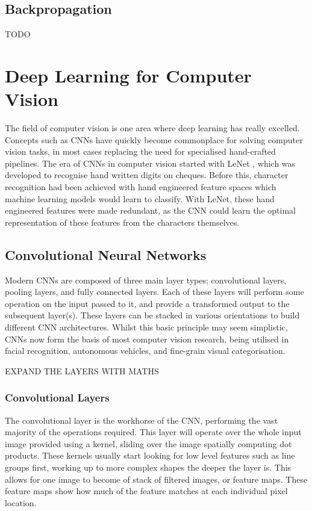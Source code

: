\subsection{Backpropagation}\label{ch:Background,sec:DLIntro,sub:backprop}
TODO


\section{Deep Learning for Computer Vision}\label{ch:Background,sec:DLforCV}

The field of computer vision is one area where deep learning has really excelled. Concepts such as CNNs have quickly become commonplace for solving computer vision tasks, in most cases replacing the need for specialised hand-crafted pipelines. The era of CNNs in computer vision started with LeNet \cite{lecun_gradient-based_1998}, which was developed to recognise hand written digits on cheques. Before this, character recognition had been achieved with hand engineered feature spaces which machine learning models would learn to classify. With LeNet, these hand engineered features were made redundant, as the CNN could learn the optimal representation of these features from the characters themselves. 

\subsection{Convolutional Neural Networks}\label{ch:Background,sec:CNN,sub:CNN}
Modern CNNs are composed of three main layer types; convolutional layers, pooling layers, and fully connected layers. Each of these layers will perform some operation on the input passed to it, and provide a transformed output to the subsequent layer(s). These layers can be stacked in various orientations to build different CNN architectures. Whilst this basic principle may seem simplistic, CNNs now form the basis of most computer vision research, being utilised in facial recognition, autonomous vehicles, and fine-grain visual categorisation. 

EXPAND THE LAYERS WITH MATHS
\subsubsection{Convolutional Layers}\label{ch:Background,sec:CNN,sub:CNN,subsub:convolution}
The convolutional layer is the workhorse of the CNN, performing the vast majority of the operations required. This layer will operate over the whole input image provided using a kernel, sliding over the image spatially computing dot products. These kernels usually start looking for low level features such as line groups first, working up to more complex shapes the deeper the layer is. This allows for one image to become of stack of filtered images, or feature maps. These feature maps show how much of the feature matches at each individual pixel location. 

